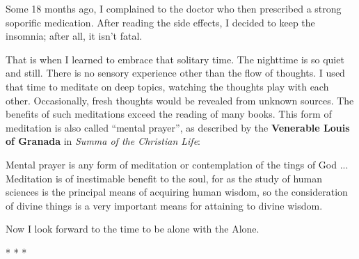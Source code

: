 Some 18 months ago, I complained to the doctor who then prescribed a strong soporific medication. After reading the side effects, I decided to keep the insomnia; after all, it isn't fatal.

That is when I learned to embrace that solitary time. The nighttime is so quiet and still. There is no sensory experience other than the flow of thoughts. I used that time to meditate on deep topics, watching the thoughts play with each other. Occasionally, fresh thoughts would be revealed from unknown sources. The benefits of such meditations exceed the reading of many books. This form of meditation is also called ``mental prayer'', as described by the \textbf{Venerable Louis of Granada} in \emph{Summa of the Christian Life}:

\begin{quotex}
Mental prayer is any form of meditation or contemplation of the tings of God ... Meditation is of inestimable benefit to the soul, for as the study of human sciences is the principal means of acquiring human wisdom, so the consideration of divine things is a very important means for attaining to divine wisdom.
\end{quotex}


Now I look forward to the time to be alone with the Alone.



\begin{center}* * *\end{center}

